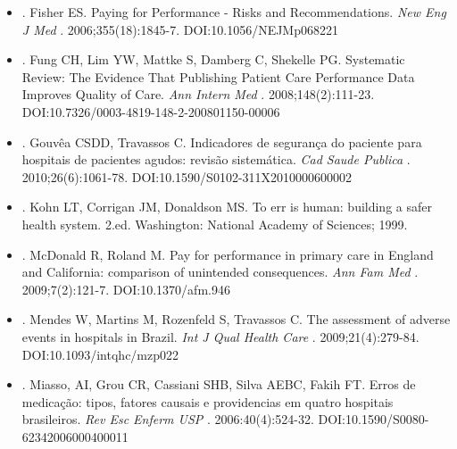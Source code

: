 \documentclass{article}
\begin{document}
\begin{itemize}
\item[%
8] %
. Fisher ES. Paying for Performance - Risks and Recommendations. %
\textit{New
            Eng J Med}
 . 2006;355(18):1845-7. DOI:10.1056/NEJMp068221  

\item[%
9] %
. Fung CH, Lim YW, Mattke S, Damberg C, Shekelle PG. Systematic Review: The
          Evidence That Publishing Patient Care Performance Data Improves Quality of Care.
\textit{Ann Intern Med}
 . 2008;148(2):111-23.
          DOI:10.7326/0003-4819-148-2-200801150-00006  

\item[%
10] %
. Gouvêa CSDD, Travassos C. Indicadores de segurança do paciente para
          hospitais de pacientes agudos: revisão sistemática. %
\textit{Cad Saude Publica}
 .
          2010;26(6):1061-78. DOI:10.1590/S0102-311X2010000600002  

\item[%
11] %
. Kohn LT, Corrigan JM, Donaldson MS. To err is human: building a safer
          health system. 2.ed. Washington: National Academy of Sciences; 1999.  

\item[%
12] %
. McDonald R, Roland M. Pay for performance in primary care in England and
          California: comparison of unintended consequences. %
\textit{Ann Fam Med}
 .
          2009;7(2):121-7. DOI:10.1370/afm.946  

\item[%
13] %
. Mendes W, Martins M, Rozenfeld S, Travassos C. The assessment of adverse
          events in hospitals in Brazil. %
\textit{Int J Qual Health Care}
 .
          2009;21(4):279-84. DOI:10.1093/intqhc/mzp022  

\item[%
14] %
. Miasso, AI, Grou CR, Cassiani SHB, Silva AEBC, Fakih FT. Erros de
          medicação: tipos, fatores causais e providencias em quatro hospitais brasileiros.
\textit{Rev Esc Enferm USP}
 . 2006:40(4):524-32.
          DOI:10.1590/S0080-62342006000400011  


\end{itemize}
\end{document}
